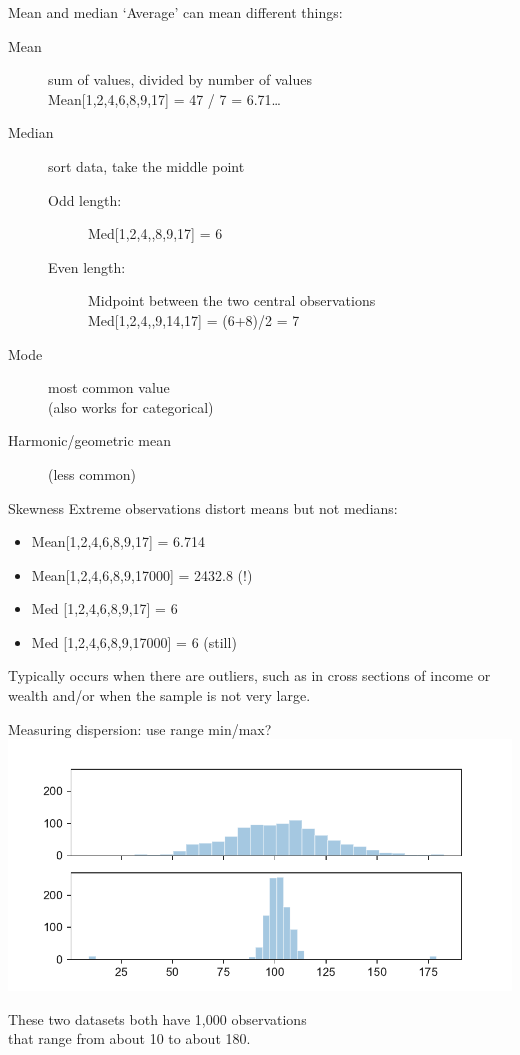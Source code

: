 \documentclass[aspectratio=169,usenames,dvipsnames]{beamer}
\begin{document}
\begin{frame}{Mean and median}
    `Average' can mean different things:
    \begin{description}
        \item[Mean] sum of values, divided by number of values \\
                Mean[1,2,4,6,8,9,17] = 47 / 7 = 6.71\dots

        \item[Median] sort data, take the middle point

            \begin{description}
            \item[Odd length:]
                Med[1,2,4,,8,9,17] = 6

            \item[Even length:]
                Midpoint between the two central observations \\
                Med[1,2,4,,9,14,17] = (6+8)/2 = 7
            \end{description}
        \item[Mode] most common value \\
            (also works for categorical)
        \item[Harmonic/geometric mean] (less common)
    \end{description}
\end{frame}

\begin{frame}{Skewness}
Extreme observations distort means but not medians:
\begin{itemize}
\item Mean[1,2,4,6,8,9,17] = 6.714
\item Mean[1,2,4,6,8,9,17000] = 2432.8 (!)
\item Med [1,2,4,6,8,9,17] = 6
\item Med [1,2,4,6,8,9,17000] = 6 (still)
\end{itemize}
Typically occurs when there are outliers,
such as in cross sections of income or wealth
and/or when the sample is not very large.
\end{frame}

\begin{frame}{Measuring dispersion: use range min/max?}
\includegraphics[width=\textwidth]{fig/disp.pdf}

These two datasets both have 1,000 observations \\
that range from about 10 to about 180.
\end{frame}
\end{document}
